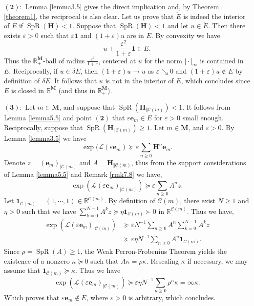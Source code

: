 \documentclass[reqno,final,11pt]{amsart}
\theoremstyle{plain}
\theoremstyle{definition}
\theoremstyle{remark}
\newcommand{\R}{\mathds{R}}
\newcommand{\M}{\bm{M}}
\newcommand{\C}{\mathcal{C}}
\renewcommand{\L}{\bm{\mathscr{L}}}
\newcommand{\ones}{\bm{1}}
\newcommand{\e}{\bm{e}}
\renewcommand{\H}{\bm{H}}
\DeclareMathOperator{\spr}{SpR}
\begin{document}
$\bm{(2):}$ Lemma \ref{lemma3.5} gives the direct implication and, by Theorem \ref{theorem1}, the reciprocal is also clear. Let us prove that $\mathring{E}$ is indeed the interior of $E$ if $\spr(\H)<1$. Suppose that $\spr(\H)<1$ and let $u\in\mathring{E}$. Then there exists $\varepsilon >0$ such that $\varepsilon \ones$ and $(1+\varepsilon)u$ are in $E$. By convexity we have \[u + \frac{\varepsilon^2}{1+\varepsilon}\ones \in E.\] Thus the $\R_+^{\M}$-ball of radius $\frac{\varepsilon^2}{1+\varepsilon}$, centered at $u$ for the norm $\vert \cdot \vert_{\infty}$ is contained in $E$. Reciprocally, if $u\in \delta E$, then $(1+\varepsilon)u \to u$ as $\varepsilon \searrow 0$ and $(1+\varepsilon)u\notin E$ by definition of $\delta E$. It follows that $u$ is not in the interior of $E$, which concludes since $E$ is closed in $\R^{\M}$ (and thus in $\R_+^{\M}$).
	
$\bm{(3):}$ Let $m\in\M$, and suppose that $\spr(\H_{\Vert \C(m)})<1$. It follows from Lemma \ref{lemma5.5} and point $\bm{(2)}$ that $\varepsilon \e_m \in E$ for $\varepsilon>0$ small enough.\\
	Reciprocally, suppose that $\spr(\H_{\Vert \C(m)})\geq 1$. Let $m\in\M$, and $\varepsilon>0$. By Lemma \ref{lemma3.5} we have
	\[\exp(\L(\varepsilon \e_m) \succeq \varepsilon \sum_{n\geq 0} \H^n \e_m.\]
	Denote $z = (\e_m)_{\vert \C(m)}$ and $A = \H_{\Vert \C(m)}$, thus from the support considerations of Lemma \ref{lemma5.5} and Remark \ref{rmk7.8} we have,
	\[ \exp(\L(\varepsilon\e_m )_{\vert\C(m)}) \succeq \varepsilon \sum_{n\geq 0} A^n z.\] 
	Let $\ones_{\C(m)} = (1,\cdots,1)\in\R^{\C(m)}$. By definition of $\C(m)$, there exist $N\geq 1$ and $\eta >0$ such that we have $\sum_{k = 0}^{N-1} A^k z \succeq \eta \ones_{\C(m)} \succ 0$ in $\R^{\C(m)}$. Thus we have,
	\begin{align*}
		\exp(\L(\varepsilon\e_m )_{\vert\C(m)}) & \succeq \varepsilon N^{-1} \sum_{n\geq 0} A^n \sum_{k= 0}^{N-1} A^k z \\
		& \succeq \varepsilon \eta N^{-1} \sum_{n\geq 0} A^n \ones_{\C(m)}.
	\end{align*}
	Since $\rho = \spr(A)\geq 1$, the Weak Perron-Frobenius Theorem yields the existence of a nonzero $\kappa \succeq 0$ such that $A\kappa = \rho \kappa$. Rescaling $\kappa$ if necessary, we may assume that $\ones_{\C(m)} \succeq \kappa$. Thus we have 
	\begin{equation*}
		 \exp(\L(\varepsilon\e_m )_{\vert\C(m)}) \succeq \varepsilon \eta N^{-1} \sum_{n\geq 0} \rho^n \kappa  = \infty \kappa.
	\end{equation*}
	Which proves that $\varepsilon \e_m \notin E$, where $\varepsilon >0$ is arbitrary, which concludes.
	
\end{document}
